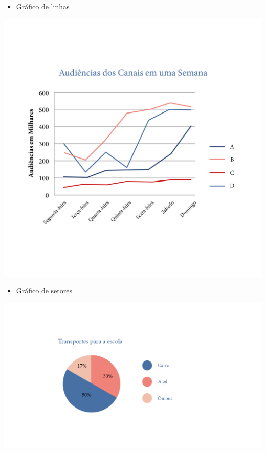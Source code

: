 {\begin{itemize}
\item
  Gráfico de linhas
\end{itemize}

\includegraphics[width=\textwidth]{../ilustracoes/MAT5/SAEB_5ANO_MAT_figura99.png}

\begin{itemize}
\item
  Gráfico de setores
\end{itemize}

\includegraphics[width=\textwidth]{../ilustracoes/MAT5/SAEB_5ANO_MAT_figura100.png}
}

